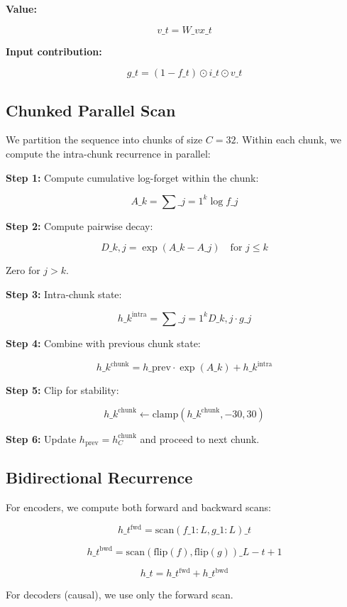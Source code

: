 \textbf{Value:}

\[
v\_t = W\_v x\_t
\tag{4.5}
\]

\textbf{Input contribution:}

\[
g\_t = (1 - f\_t) \odot i\_t \odot v\_t
\tag{4.6}
\]

\subsection{Chunked Parallel Scan}

We partition the sequence into chunks of size $C = 32$. Within each chunk, 
we compute the intra-chunk recurrence in parallel:

\textbf{Step 1:} Compute cumulative log-forget within the chunk:

\[
A\_k = \sum\_{j=1}^{k} \log f\_j
\tag{4.7}
\]

\textbf{Step 2:} Compute pairwise decay:

\[
D\_{k,j} = \exp(A\_k - A\_j) \quad \text{for } j \leq k
\tag{4.8}
\]

Zero for $j > k$.

\textbf{Step 3:} Intra-chunk state:

\[
h\_k^\text{intra} = \sum\_{j=1}^{k} D\_{k,j} \cdot g\_j
\tag{4.9}
\]

\textbf{Step 4:} Combine with previous chunk state:

\[
h\_k^\text{chunk} = h\_\text{prev} \cdot \exp(A\_k) + h\_k^\text{intra}
\tag{4.10}
\]

\textbf{Step 5:} Clip for stability:

\[
h\_k^\text{chunk} \leftarrow \text{clamp}(h\_k^\text{chunk}, -30, 30)
\tag{4.11}
\]

\textbf{Step 6:} Update $h_\text{prev} = h_C^\text{chunk}$ and proceed to next chunk.

\subsection{Bidirectional Recurrence}

For encoders, we compute both forward and backward scans:

\[
h\_t^\text{fwd} = \text{scan}(f\_{1:L}, g\_{1:L})\_t
\tag{4.12}
\]

\[
h\_t^\text{bwd} = \text{scan}(\text{flip}(f), \text{flip}(g))\_{L-t+1}
\tag{4.13}
\]

\[
h\_t = h\_t^\text{fwd} + h\_t^\text{bwd}
\tag{4.14}
\]

For decoders (causal), we use only the forward scan.

